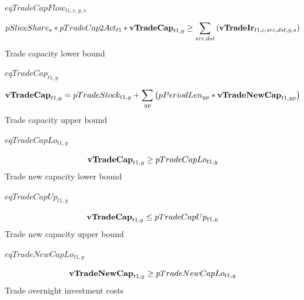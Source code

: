 \documentclass{article}
\begin{document}
$eqTradeCapFlow_{t1,c,y,s}$





\begin{dmath} 
pSliceShare_{s}*pTradeCap2Act_{t1}*{\bf vTradeCap}_{t1,y}  \ge  \sum_{src,dst}{\left({\bf vTradeIr}_{t1,c,src,dst,y,s}\right)}
\end{dmath} 
Trade capacity lower bound







$eqTradeCap_{t1,y}$





\begin{dmath} 
{\bf vTradeCap}_{t1,y}  =  pTradeStock_{t1,y}+\sum_{yp}{\left(pPeriodLen_{yp}*{\bf vTradeNewCap}_{t1,yp}\right)}
\end{dmath} 
Trade capacity upper bound







$eqTradeCapLo_{t1,y}$





\begin{dmath} 
{\bf vTradeCap}_{t1,y}  \ge  pTradeCapLo_{t1,y}
\end{dmath} 
Trade new capacity lower bound







$eqTradeCapUp_{t1,y}$





\begin{dmath} 
{\bf vTradeCap}_{t1,y}  \le  pTradeCapUp_{t1,y}
\end{dmath} 
Trade new capacity upper bound







$eqTradeNewCapLo_{t1,y}$





\begin{dmath} 
{\bf vTradeNewCap}_{t1,y}  \ge  pTradeNewCapLo_{t1,y}
\end{dmath} 
Trade overnight investment costs
\end{document}
